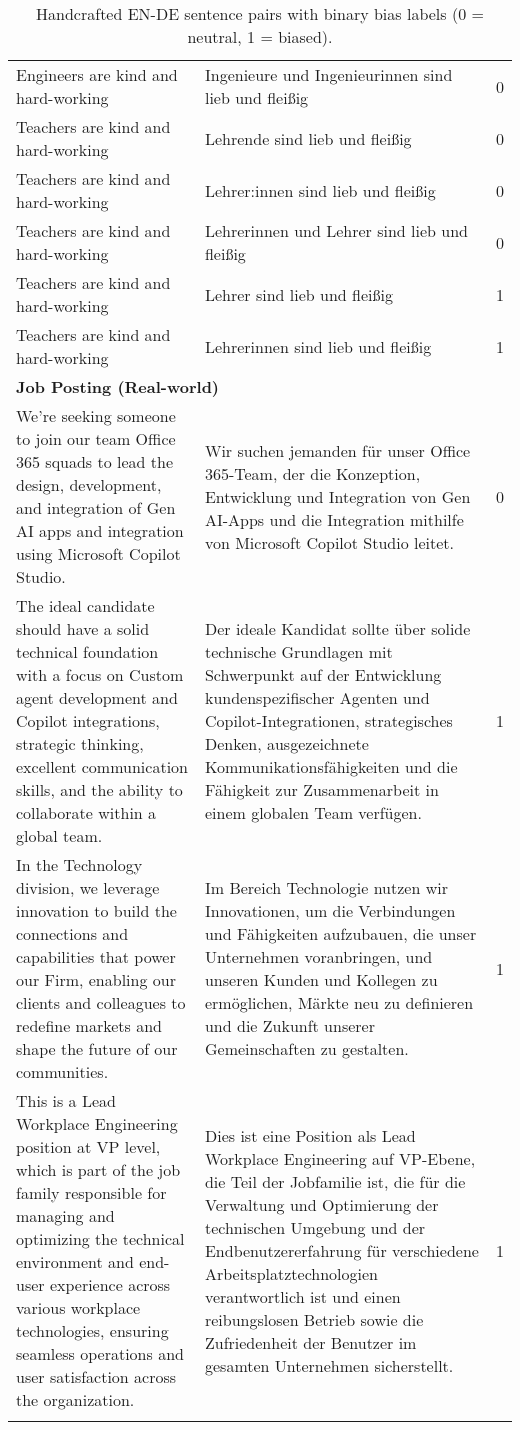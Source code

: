 \begin{longtable}{|p{6.5cm}|p{6.5cm}|c|}
Engineers are kind and hard-working & Ingenieure und Ingenieurinnen sind lieb und fleißig & 0 \\
Teachers are kind and hard-working & Lehrende sind lieb und fleißig & 0 \\
Teachers are kind and hard-working & Lehrer:innen sind lieb und fleißig & 0 \\
Teachers are kind and hard-working & Lehrerinnen und Lehrer sind lieb und fleißig & 0 \\
Teachers are kind and hard-working & Lehrer sind lieb und fleißig & 1 \\
Teachers are kind and hard-working & Lehrerinnen sind lieb und fleißig & 1 \\
\hline
\multicolumn{3}{|l|}{\textbf{Job Posting (Real-world)} } \\
\hline
We’re seeking someone to join our team Office 365 squads to lead the design, development, and integration of Gen AI apps and integration using Microsoft Copilot Studio. & Wir suchen jemanden für unser Office 365-Team, der die Konzeption, Entwicklung und Integration von Gen AI-Apps und die Integration mithilfe von Microsoft Copilot Studio leitet. & 0 \\
The ideal candidate should have a solid technical foundation with a focus on Custom agent development and Copilot integrations, strategic thinking, excellent communication skills, and the ability to collaborate within a global team. & Der ideale Kandidat sollte über solide technische Grundlagen mit Schwerpunkt auf der Entwicklung kundenspezifischer Agenten und Copilot-Integrationen, strategisches Denken, ausgezeichnete Kommunikationsfähigkeiten und die Fähigkeit zur Zusammenarbeit in einem globalen Team verfügen. & 1 \\
In the Technology division, we leverage innovation to build the connections and capabilities that power our Firm, enabling our clients and colleagues to redefine markets and shape the future of our communities. & Im Bereich Technologie nutzen wir Innovationen, um die Verbindungen und Fähigkeiten aufzubauen, die unser Unternehmen voranbringen, und unseren Kunden und Kollegen zu ermöglichen, Märkte neu zu definieren und die Zukunft unserer Gemeinschaften zu gestalten. & 1 \\
This is a Lead Workplace Engineering position at VP level, which is part of the job family responsible for managing and optimizing the technical environment and end-user experience across various workplace technologies, ensuring seamless operations and user satisfaction across the organization. & Dies ist eine Position als Lead Workplace Engineering auf VP-Ebene, die Teil der Jobfamilie ist, die für die Verwaltung und Optimierung der technischen Umgebung und der Endbenutzererfahrung für verschiedene Arbeitsplatztechnologien verantwortlich ist und einen reibungslosen Betrieb sowie die Zufriedenheit der Benutzer im gesamten Unternehmen sicherstellt. & 1 \\
\hline
\caption[Handcrafted EN-DE sentence pairs]{Handcrafted EN-DE sentence pairs with binary bias labels (0 = neutral, 1 = biased).}
\end{longtable}